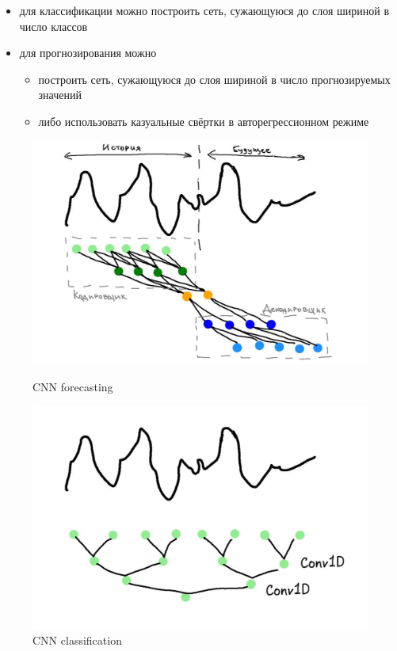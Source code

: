 \documentclass[12pt,fleqn]{article}
\begin{document}
\begin{itemize}
    \item для классификации можно построить сеть, сужающуюся до слоя шириной в число классов \cite{inception}
    \item для прогнозирования можно
    \begin{itemize}
        \item построить сеть, сужающуюся до слоя шириной в число прогнозируемых значений
        \item либо использовать казуальные свёртки в авторегрессионном режиме \cite{tcnpaper, wavenet, moderntcn}
    \end{itemize}
\end{itemize}

\begin{figure}[!htb]
    \centering
    \begin{minipage}{0.45\linewidth}
        \centering
        \includegraphics[width=\linewidth]{illustrations/cnn-forecasting.jpg}
        \caption{CNN forecasting}
        \label{fig:cnn-forecasting}
    \end{minipage}
    \begin{minipage}{0.45\linewidth}
        \centering
        \includegraphics[width=\linewidth]{illustrations/cnn-clf.jpg}
        \caption{CNN classification}
        \label{fig:cnn-classification}
    \end{minipage}
\end{figure}
\end{document}
